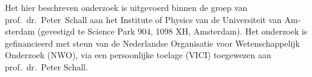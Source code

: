 \begin{otherlanguage}{dutch}
{\small \noindent Het hier beschreven onderzoek is uitgevoerd binnen de groep van prof.~dr.~Peter~Schall aan het Institute of Physics van de Universiteit van Amsterdam (gevestigd te Science Park 904, 1098 XH, Amsterdam). Het onderzoek is gefinancieerd met steun van de Nederlandse Organisatie voor Wetenschappelijk Onderzoek (NWO), via een persoonlijke toelage (VICI) toegewezen aan prof.~dr.~Peter Schall.} \vspace{0.5em}
\end{otherlanguage}
\clearpage